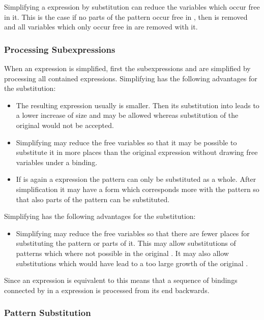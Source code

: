 Simplifying a  expression by substitution can reduce the variables which occur free in it. This is the case if no
parts of the pattern  occur free in , then  is removed and all variables which only occur free
in  are removed with it.

\subsubsection{Processing Subexpressions}

When an expression  is simplified, first the subexpressions  and  are
simplified by processing all contained  expressions. Simplifying  has the following advantages for the 
substitution:
\begin{itemize}
\item The resulting expression usually is smaller. Then its substitution into  leads to a lower increase of
size and may be allowed whereas substitution of the original  would not be accepted.
\item Simplifying may reduce the free variables so that it may be possible to substitute it in more places than
the original expression without drawing free variables under a binding.
\item If  is again a  expression the pattern can only be substituted as a whole. After simplification 
it may have a form which corresponds more with the pattern so that also parts of the pattern can be substituted.
\end{itemize}
Simplifying  has the following advantages for the substitution:
\begin{itemize}
\item Simplifying may reduce the free variables so that there are fewer places for substituting the pattern
or parts of it. This may allow substitutions of patterns which where not possible in the original .
It may also allow substitutions which would have lead to a too large growth of the original .
\end{itemize}

Since an expression  is equivalent to  this means that a sequence of bindings connected by  in a  expression is processed
from its end backwards.

\subsubsection{Pattern Substitution}

